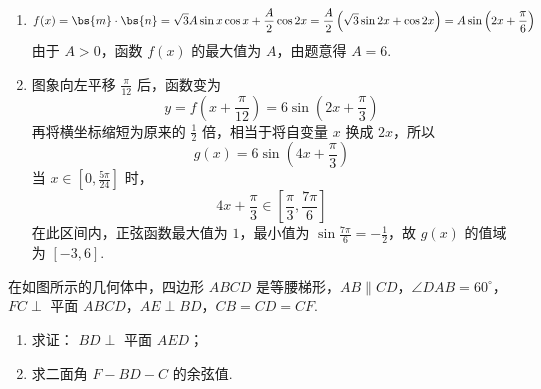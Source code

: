 \begin{solution}
\begin{enumerate}
\item
\[
f(x)=\bs{m}\cdot\bs{n}=\sqrt3A\sin x\cos x+\frac A2\cos2x
=\frac A2\left(\sqrt3\sin2x+\cos2x\right)
=A\sin\left(2x+\frac{\pi}{6}\right)
\]
由于 \(A>0\)，函数 \(f(x)\) 的最大值为 \(A\)，由题意得 \(A=6\).
\item
图象向左平移 \(\frac{\pi}{12}\) 后，函数变为
\[
y=f\left(x+\frac{\pi}{12}\right)
=6\sin\left(2x+\frac{\pi}{3}\right)
\]
再将横坐标缩短为原来的 \(\frac12\) 倍，相当于将自变量 \(x\) 换成 \(2x\)，所以
\[
g(x)=6\sin\left(4x+\frac{\pi}{3}\right)
\]
当 \(x\in\left[0,\frac{5\pi}{24}\right]\) 时，
\[
4x+\frac{\pi}{3}\in\left[\frac{\pi}{3},\frac{7\pi}{6}\right]
\]
在此区间内，正弦函数最大值为 \(1\)，最小值为 \(\sin\frac{7\pi}{6}=-\frac12\)，故 \(g(x)\) 的值域为 \([-3,6]\).
\end{enumerate}
\end{solution}

\begin{problem}
在如图所示的几何体中，四边形 \(ABCD\) 是等腰梯形，\(AB \parallel CD\)，\(\angle DAB = 60^{\circ}\)，\(FC \perp\) 平面 \(ABCD\)，\(AE \perp BD\)，\(CB = CD = CF\).
\begin{enumerate}
\item 求证： \(BD \perp\) 平面 \(AED\)；
\item 求二面角 \(F - BD - C\) 的余弦值.
\end{enumerate}

\end{problem}

